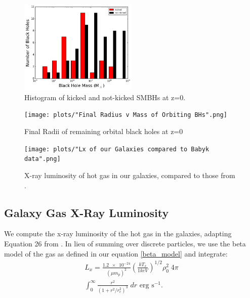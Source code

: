 \documentclass[english, backref,breaklinks,colorlinks,citecolor=blue, usenatbib]{mnras}
\begin{document}
\begin{figure}[ht]
\begin{center}
\includegraphics[width=0.5\textwidth]{plots/kicked_stats.png}
\caption{Histogram of kicked and not-kicked SMBHs at z=0.}
\label{fig:kicked_stats}
\end{center}
\end{figure}

\begin{figure}
\begin{center}
\texttt{[image: plots/"Final Radius v Mass of Orbiting BHs".png]}
\caption{Final Radii of remaining orbital black holes at z=0}
\label{fig:mvr}
\end{center}
\end{figure}

\begin{figure}
\vspace{20pt}%
\begin{center}
\texttt{[image: plots/"Lx of our Galaxies compared to Babyk data".png]}
\caption{X-ray luminosity of hot gas in our galaxies, compared to those from \citet{2018ApJ...857...32B}.}
\label{fig:galgas1}
\end{center}
\end{figure}

\subsection{Galaxy Gas X-Ray Luminosity}
We compute the x-ray luminosity of the hot gas in the galaxies, adapting Equation 26 from \citet{2012ApJ...754..125C}. In lieu of summing over discrete particles, we use the beta model of the gas as defined in our equation \ref{beta_model} and integrate:
\begin{equation}
\begin{aligned}
    L_x ={} \frac{\num{1.2e-24}}{(\mu m_p)^2}\left(\frac{kT_x}{1keV}\right)^{1/2}\rho_0^{2}\;4{\pi} \\
    \int_{0}^{\infty}\frac{r^2}{(1+r^2/r_c^2)^{3}}\;dr\text{  erg s}^{-1}.
\end{aligned}
\end{equation}
\end{document}
